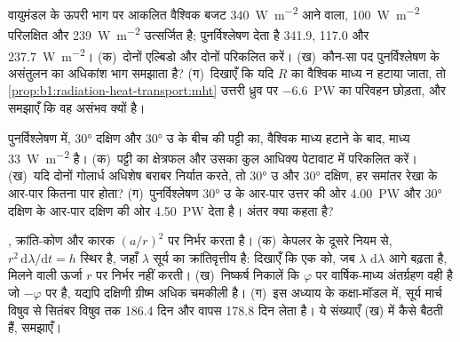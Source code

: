\begin{exercise}[$\star\star$]\label{exo:b1:radiation-heat-transport:8}
वायुमंडल के ऊपरी भाग पर आकलित वैश्विक बजट \qty{340}{W.m^{-2}} आने वाला, \qty{100}{W.m^{-2}} परिलक्षित और \qty{239}{W.m^{-2}} उत्सर्जित है; पुनर्विश्लेषण देता है \qty{341.9}{}, \qty{117.0}{} और \qty{237.7}{W.m^{-2}}। (क)~दोनों एल्बिडो और दोनों  परिकलित करें। (ख)~कौन-सा पद पुनर्विश्लेषण के असंतुलन का अधिकांश भाग समझाता है? (ग)~दिखाएँ कि यदि $R$ का वैश्विक माध्य न हटाया जाता, तो \cref{prop:b1:radiation-heat-transport:mht} उत्तरी ध्रुव पर \qty{-6.6}{PW} का परिवहन छोड़ता, और समझाएँ कि वह असंभव क्यों है।
\end{exercise}

\begin{exercise}[$\star\star$]\label{exo:b1:radiation-heat-transport:9}
पुनर्विश्लेषण में, \ang{30} दक्षिण और \ang{30} उ के बीच की पट्टी का, वैश्विक माध्य हटाने के बाद, माध्य  \qty{+33}{W.m^{-2}} है। (क)~पट्टी का क्षेत्रफल और उसका कुल आधिक्य पेटावाट में परिकलित करें। (ख)~यदि दोनों गोलार्ध अधिशेष बराबर निर्यात करते, तो \ang{30} उ और \ang{30} दक्षिण, हर समांतर रेखा के आर-पार कितना पार होता? (ग)~पुनर्विश्लेषण \ang{30} उ के आर-पार उत्तर की ओर \qty{4.00}{PW} और \ang{30} दक्षिण के आर-पार दक्षिण की ओर \qty{4.50}{PW} देता है। अंतर क्या कहता है?
\end{exercise}

\begin{exercise}[$\star\star\star$]\label{exo:b1:radiation-heat-transport:10}
 , क्रांति-कोण और कारक
$(a/r)^2$ पर निर्भर करता है। (क)~केपलर के दूसरे नियम से, $r^2\,\mathrm d\lambda/\mathrm dt = h$ स्थिर है, जहाँ $\lambda$ सूर्य का क्रांतिवृत्तीय  है: दिखाएँ कि एक  को, जब $\lambda$ $\mathrm d\lambda$ आगे बढ़ता है, मिलने वाली ऊर्जा $r$ पर निर्भर नहीं करती।
(ख)~निष्कर्ष निकालें कि  $\varphi$ पर वार्षिक-माध्य अंतर्ग्रहण वही है जो $-\varphi$ पर है, यद्यपि दक्षिणी ग्रीष्म अधिक चमकीली है। (ग)~इस अध्याय के कक्षा-मॉडल में, सूर्य मार्च विषुव से सितंबर विषुव तक \num{186.4} दिन और वापस \num{178.8} दिन लेता है। ये संख्याएँ (ख) में कैसे बैठती हैं, समझाएँ।
\end{exercise}


